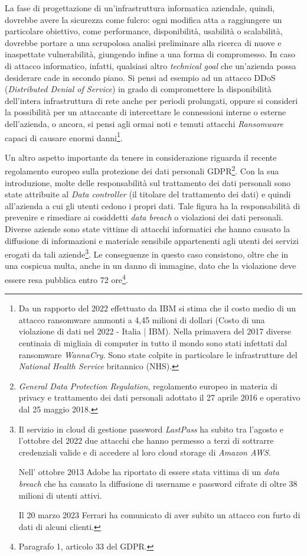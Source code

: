\documentclass[target=mst,aauheader=]{thud}
\begin{document}
La fase di progettazione di un’infrastruttura informatica aziendale, quindi, dovrebbe avere la sicurezza come fulcro: ogni modifica atta a raggiungere un particolare obiettivo, come performance, disponibilità, usabilità o scalabilità, dovrebbe portare a una scrupolosa analisi preliminare alla ricerca di nuove e inaspettate vulnerabilità, giungendo infine a una forma di compromesso. In caso di attacco informatico, infatti, qualsiasi altro \textit{technical goal} che un’azienda possa desiderare cade in secondo piano. Si pensi ad esempio ad un attacco DDoS (\textit{Distributed Denial of Service}) in grado di compromettere la disponibilità dell’intera infrastruttura di rete anche per periodi prolungati, oppure si consideri la possibilità per un attaccante di intercettare le connessioni interne o esterne dell’azienda, o ancora, si pensi agli ormai noti e temuti attacchi \textit{Ransomware} capaci di causare enormi danni\footnote{Da un rapporto del 2022 effettuato da IBM si stima che il costo medio di un attacco ransomware ammonti a 4,45 milioni di dollari (Costo di una violazione di dati nel 2022 - Italia | IBM).
Nella primavera del 2017 diverse centinaia di migliaia di computer in tutto il mondo sono stati infettati dal ransomware \textit{WannaCry}. Sono state colpite in particolare le infrastrutture del \textit{National Health Service} britannico (NHS).
}.

Un altro aspetto importante da tenere in considerazione riguarda il recente regolamento europeo sulla protezione dei dati personali GDPR\footnote{\textit{General Data Protection Regulation}, regolamento europeo in materia di privacy e trattamento dei dati personali adottato il 27 aprile 2016 e operativo dal 25 maggio 2018.}. Con la sua introduzione, molte delle responsabilità sul trattamento dei dati personali sono state attribuite al \textit{Data controller} (il titolare del trattamento dei dati) e quindi all’azienda a cui gli utenti cedono i propri dati. Tale figura ha la responsabilità di prevenire e rimediare ai cosiddetti \textit{data breach} o violazioni dei dati personali. Diverse aziende sono state vittime di attacchi informatici che hanno causato la diffusione di informazioni e materiale sensibile appartenenti agli utenti dei servizi erogati da tali aziende\footnote{Il servizio in cloud di gestione password \textit{LastPass} ha subito tra l’agosto e l’ottobre del 2022 due attacchi che hanno permesso a terzi di sottrarre credenziali valide e di accedere al loro cloud storage di \textit{Amazon AWS}.

Nell’ ottobre 2013 Adobe ha riportato di essere stata vittima di un \textit{data breach} che ha causato la diffusione di username e password cifrate di oltre 38 milioni di utenti attivi.

Il 20 marzo 2023 Ferrari ha comunicato di aver subito un attacco con furto di dati di alcuni clienti.
}. Le conseguenze in questo caso consistono, oltre che in una cospicua multa, anche in un danno di immagine, dato che la violazione deve essere resa pubblica entro 72 ore\footnote{Paragrafo 1, articolo 33 del GDPR.}.
\end{document}
